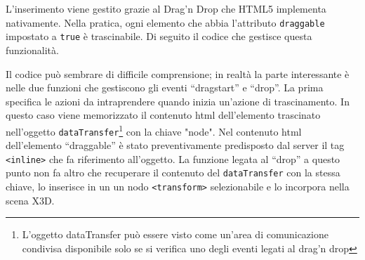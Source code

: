 L'inserimento viene gestito grazie al Drag'n Drop che HTML5 implementa nativamente. Nella pratica, ogni elemento che abbia l'attributo \texttt{drag\-gable} impostato a \texttt{true} è trascinabile. Di seguito il codice che gestisce questa funzionalità.


Il codice può sembrare di difficile comprensione; in realtà la parte interessante è nelle due funzioni che gestiscono gli eventi ``dragstart'' e ``drop''. La prima specifica le azioni da intraprendere quando inizia un'azione di trascinamento. In questo caso viene memorizzato il contenuto html dell'elemento trascinato nell'oggetto \texttt{dataTransfer}\footnote{L'oggetto dataTransfer può essere visto come un'area di comunicazione condivisa disponibile solo se si verifica uno degli eventi legati al drag'n drop} con la chiave "node". Nel contenuto html dell'elemento ``draggable'' è stato preventivamente predisposto dal server il tag \texttt{<inline>} che fa riferimento all'oggetto. La funzione legata al ``drop'' a questo punto non fa altro che recuperare il contenuto del \texttt{dataTransfer} con la stessa chiave, lo inserisce in un un nodo \texttt{<transform>} selezionabile e lo incorpora nella scena X3D.

